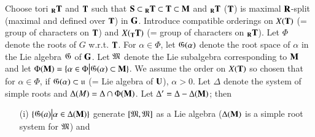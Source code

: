 \section{}\label{art9-appsec-A4}%
\begin{notation*}
Choose tori ${}_{\mathbf{R}} \mathbf{T}$ and $\mathbf{T}$ such that $\mathbf{S} \subset {}_{\mathbf{R}} \mathbf{T} \subset \mathbf{T} \subset \mathbf{M}$ and ${}_{\mathbf{R}} \mathbf{T}$ (\resp $\mathbf{T}$) is maximal $\mathbf{R}$-split (\resp maximal and defined over $\mathbf{T}$) in $\mathbf{G}$. Introduce compatible orderings on $X(\mathbf{T})$ (= group of characters on $\mathbf{T}$) and $X ({}_{\mathbf{T}} \mathbf{T})$ (= group of characters on ${}_{\mathbf{R}} \mathbf{T}$). Let $\Phi$ denote the roots of $G$ w.r.t. $\mathbf{T}$. For $\alpha \in \Phi$, let $\mathfrak{G} (\alpha)$ denote the root space of $\alpha$ in the Lie algebra $\mathfrak{G}$ of $\mathbf{G}$. Let $\mathfrak{M}$ denote the Lie subalgebra corresponding to $\mathbf{M}$ and let $\Phi (\mathbf{M}) = \{\alpha \in \Phi \big| \mathfrak{G} (\alpha) \subset \mathbf{M}\}$. We assume the order on $X (\mathbf{T})$ so chosen that for $\alpha \in \Phi$, if $\mathfrak{G} (\alpha) \subset \mathfrak{u}$ (= Lie algebra of $\mathbf{U}$), $\alpha > 0$. Let $\Delta$ denote the system of simple roots and $\Delta (M) = \Delta \cap \Phi (\mathbf{M})$. Let $\Delta' = \Delta - \Delta (\mathbf{M})$; then 
\begin{itemize}
\item[(i)] $\{\mathfrak{G} (a) \big| \alpha \in \Delta (\mathbf{M})\}$ generate $[\mathfrak{M}, \mathfrak{M}]$ as a Lie algebra ($\Delta (\mathbf{M})$ is a simple root system for $\mathfrak{M}$) and 


\end{itemize}
\end{notation*}

